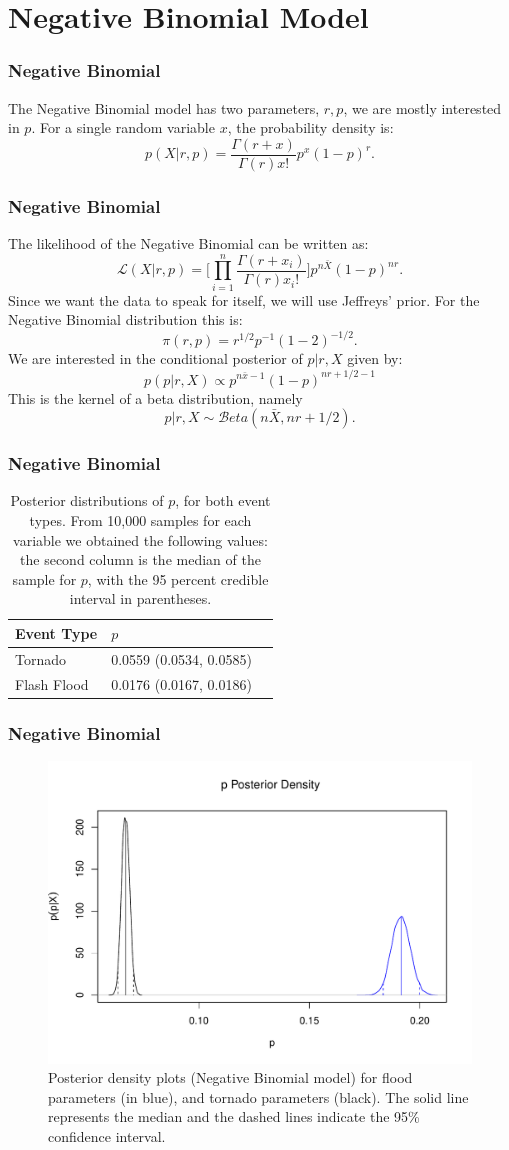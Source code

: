 \documentclass{beamer}
\begin{document}
	\section{Negative Binomial Model}
	\begin{frame}
		\frametitle{Negative Binomial}
		The Negative Binomial model has two parameters, $r,p$, we are mostly interested in $p$. For a single random variable $x$, the probability density is:
$$p(X|r,p)=\frac{\Gamma(r+x)}{\Gamma(r)x!}p^{x}(1-p)^{r}.$$
	\end{frame}
	\begin{frame}
		\frametitle{Negative Binomial}
		The likelihood of the Negative Binomial can be written as:
$$\mathcal{L}(X|r,p)=\Bigg[\prod_{i=1}^n\frac{\Gamma(r+x_i)}{\Gamma(r)x_i!}\Bigg]p^{n\bar{X}}(1-p)^{nr}.$$
Since we want the data to speak for itself, we will use Jeffreys' prior. For the Negative Binomial distribution this is:
$$\pi(r,p)=r^{1/2}p^{-1}(1-2)^{-1/2}.$$
We are interested in the conditional posterior of $p|r,X$ given by:
$$p(p|r,X)\propto p^{n\bar{x}-1}(1-p)^{nr+1/2-1}$$ 
This is the kernel of a beta distribution, namely
$$p|r,X\sim\mathcal{B}eta(n\bar{X},nr+1/2).$$
	\end{frame}
		\begin{frame}
		\frametitle{Negative Binomial}
		\begin{table}
    \centering
    \caption{Posterior distributions of $p$, for both event types. From 10,000 samples for each variable we obtained the following values: the second column is the median of the sample for $p$, with the 95 percent credible interval in parentheses.}
    \label{t:rNB}
    \begin{tabular}{| l | l | l |}
    \hline
    Event Type & $p$  \\ \hline
    Tornado & 0.0559 (0.0534, 0.0585) \\ \hline
    Flash Flood & 0.0176 (0.0167, 0.0186) \\ \hline
    \end{tabular}
\end{table}
	\end{frame}
		\begin{frame}
		\frametitle{Negative Binomial}
		\begin{figure}[p]
\centering
\includegraphics[width=.65\textwidth]{figure/NB_Density.pdf}
\caption{Posterior density plots (Negative Binomial model) for flood parameters (in blue), and tornado parameters (black). The solid line represents the median and the dashed lines indicate the 95\% confidence interval.}
\label{f:nbdensity}
\end{figure}
	\end{frame}
\end{document}
